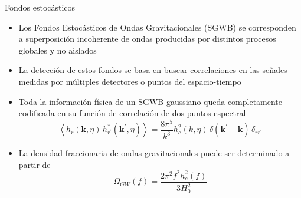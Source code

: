 \documentclass{beamer}
\begin{document}
            \begin{frame}{Fondos estocásticos}
                \begin{itemize}
                    \item[\textcolor{brown}{$\bullet$}] Los Fondos Estocásticos de Ondas Gravitacionales (SGWB) se corresponden a superposición incoherente de ondas producidas por distintos procesos globales y no aislados
                    \item[\textcolor{brown}{$\bullet$}] La detección de estos fondos se basa en buscar correlaciones en las señales medidas por múltiples detectores o puntos del espacio-tiempo
                    \item[\textcolor{brown}{$\bullet$}] Toda la información física de un SGWB gaussiano queda completamente codificada en su función de correlación de dos puntos espectral
                        \begin{equation*}
                            \left\langle h_r (\textbf{k}, \eta) \, h_{r^\prime}^* (\textbf{k}^\prime, \eta) \right\rangle = \frac{8 \pi^5}{k^3} h_c^2 (k, \eta) \, \delta (\textbf{k}^\prime - \textbf{k}) \, \delta_{rr^\prime} 
                        \end{equation*}
                    \item[\textcolor{brown}{$\bullet$}] La densidad fraccionaria de ondas gravitacionales puede ser determinado a partir de
                        \begin{equation*}
                            \Omega_{GW} (f) = \frac{2 \pi^2 f^2 h_c^2 (f)}{3 H_0^2}
                        \end{equation*}
                \end{itemize}
            \end{frame}
\end{document}

